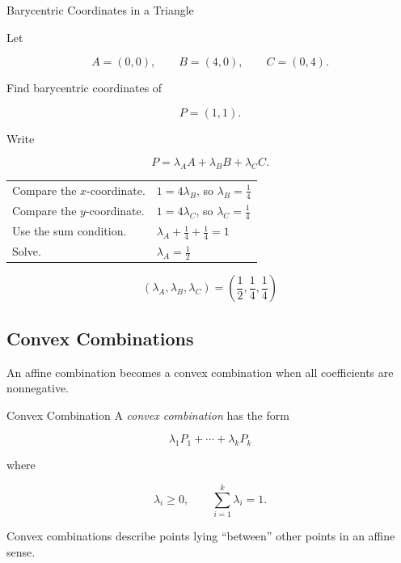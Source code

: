 \begin{workedexamplebox}{Barycentric Coordinates in a Triangle}

Let

\[
A=(0,0),\qquad
B=(4,0),\qquad
C=(0,4).
\]

Find barycentric coordinates of

\[ P=(1,1). \]

Write

\[ P=\lambda_AA+\lambda_BB+\lambda_CC. \]

\begin{tabularx}{\textwidth}{@{}>{\raggedright\arraybackslash}p{}X@{}}
Compare the \(x\)-coordinate. &
\(1=4\lambda_B\), so \(\lambda_B=\frac14\)\\
Compare the \(y\)-coordinate. &
\(1=4\lambda_C\), so \(\lambda_C=\frac14\)\\
Use the sum condition. &
\(\lambda_A+\frac14+\frac14=1\)\\
Solve. &
\(\lambda_A=\frac12\)
\end{tabularx}

\begin{answerbox}
\[ \boxed{(\lambda_A,\lambda_B,\lambda_C)=\left(\frac12,\frac14,\frac14\right)} \]
\end{answerbox}
\end{workedexamplebox}

\subsection{Convex Combinations}
\label{subsec:affine-convex-combinations}

An affine combination becomes a convex combination when all coefficients are
nonnegative.

\begin{definitionbox}{Convex Combination}
A \emph{convex combination} has the form

\[
\boxed{
\lambda_1P_1+\cdots+\lambda_kP_k
}
\]

where

\[
\boxed{
\lambda_i\geq0,
\qquad
\sum_{i=1}^{k}\lambda_i=1.
}
\]
\end{definitionbox}

Convex combinations describe points lying ``between'' other points in an
affine sense.

